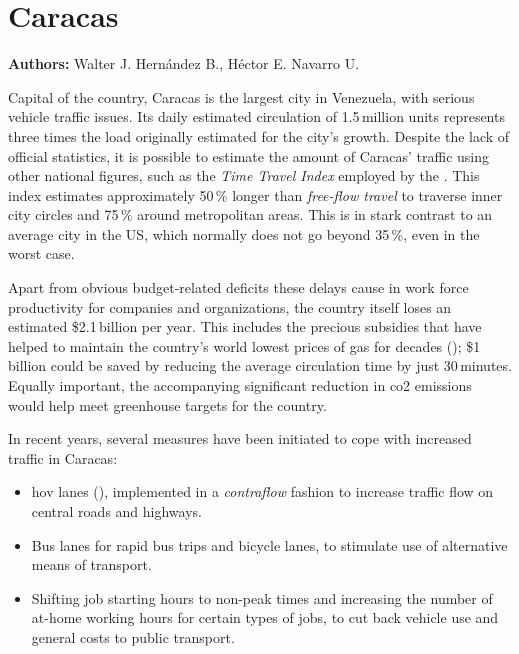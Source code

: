 \chapter{Caracas}
\label{ch:caracas}
\hfill \textbf{Authors:} Walter J. Hernández B., Héctor E. Navarro U.


Capital of the country, Caracas is the largest city in Venezuela, with serious vehicle traffic issues. Its daily estimated circulation of 1.5\,million units represents three times the load originally estimated for the city's growth. %
Despite the lack of official statistics, it is possible to estimate the amount of Caracas' traffic using other national figures, such as the \emph{Time Travel Index} employed by the \citet{fhwa2013}. This index estimates approximately 50\,\% longer than \emph{free-flow travel} to traverse inner city circles and 75\,\% around  metropolitan areas. This is in stark contrast to an average city in the US, which normally does not go beyond 35\,\%, even in the worst case.

Apart from obvious budget-related deficits these delays cause in work force productivity for companies and organizations, the country itself loses an estimated \$2.1\,billion per year. This includes the precious subsidies that have helped to maintain the country's world lowest prices of gas for decades (\citet{wilson2008}); \$1\,billion could be saved by reducing the average circulation time by just 30\,minutes. Equally important, the accompanying significant reduction in \gls{co2} emissions would help meet greenhouse targets for the country.

In recent years, several measures have been initiated to cope with increased traffic in Caracas:

\begin{itemize}\styleItemize
\item \gls{hov} lanes (\citet{turnbull1990}), implemented in a \emph{contraflow} fashion to increase traffic flow on central roads and highways.

\item Bus lanes for rapid bus trips and bicycle lanes, to stimulate use of alternative means of transport.

\item Shifting job starting hours to non-peak times and increasing the number of at-home working hours for certain types of jobs, to cut back vehicle use and general costs to public transport.
\end{itemize}

